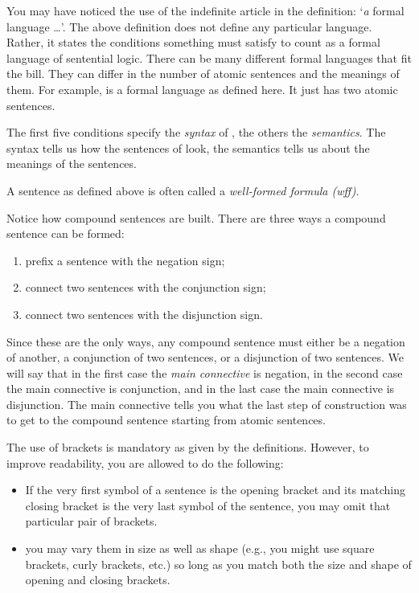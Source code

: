 You may have noticed the use of the indefinite article in the definition: 
`\emph{a} formal language \lL{} \ldots'. The above definition does not define any 
particular language. Rather, it states the conditions something must satisfy to 
count as a formal language of sentential logic. There can be many different 
formal languages that fit the bill. They can differ in the number of atomic 
sentences and the meanings of them. For example, \lL[S]{} is a formal language as 
defined here. It just has two atomic sentences. 

The first five conditions specify the \emph{syntax} of \lL{}, the others the 
\emph{semantics}. The syntax tells us  how the sentences of \lL{} look, the 
semantics tells us about the meanings of the sentences.

A sentence as defined above is often called a \emph{well-formed formula (wff)}. 






Notice how compound sentences are built. There are three ways a compound 
sentence can be formed:

\begin{enumerate}
 \renewcommand{\labelenumi}{\roman{enumi}.}

\item prefix a sentence with the negation sign;

\item connect two sentences with the conjunction sign;

\item connect two sentences with the disjunction sign.

 \end{enumerate}

Since these are the only ways, any compound sentence must either be a negation 
of another, a conjunction of two sentences, or a disjunction of two sentences.  
We will say that in the first case the \emph{main connective} is negation, in 
the second case the main connective is conjunction, and in the last case the 
main connective  is disjunction.  The main connective tells you what the last 
step of construction was to get to the compound sentence starting from atomic 
sentences.

The use of brackets is mandatory as given by the definitions.  However, to 
improve readability, you are allowed to do the following:

\begin{itemize}

 \item  If the very first symbol of a sentence is the opening bracket and its 
  matching closing bracket is the very last symbol of the sentence, you may omit 
  that particular pair of brackets.  
 
 \item you may vary them in size as well as shape (e.g., you might use square 
  brackets, curly brackets, etc.) so long as you match both the size and shape 
  of  opening and closing brackets. 

\end{itemize}


